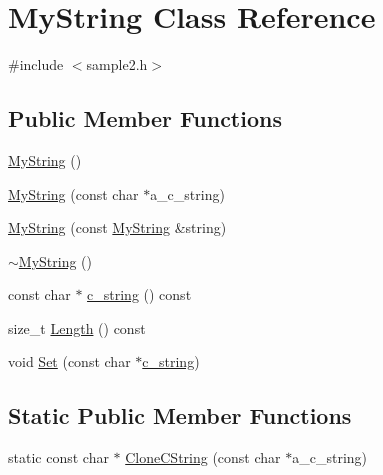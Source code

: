 \hypertarget{class_my_string}{\section{My\-String Class Reference}
\label{class_my_string}
}


{\ttfamily \#include $<$sample2.\-h$>$}

\subsection*{Public Member Functions}
\begin{DoxyCompactItemize}
\item 
\hyperlink{class_my_string_a1cb17852b83614394b59720779c5f918}{My\-String} ()
\item 
\hyperlink{class_my_string_a28134eb91b6698f46b12accefa157d0f}{My\-String} (const char $\ast$a\-\_\-c\-\_\-string)
\item 
\hyperlink{class_my_string_ae24c7cf89a58dd2287303df2ac054c66}{My\-String} (const \hyperlink{class_my_string}{My\-String} \&string)
\item 
\hyperlink{class_my_string_a7bee4fe8ad82a0b7b8f65b02054b156b}{$\sim$\-My\-String} ()
\item 
const char $\ast$ \hyperlink{class_my_string_a0089588935fc8235124f58f514cb07a1}{c\-\_\-string} () const 
\item 
size\-\_\-t \hyperlink{class_my_string_a878f7e0a327814729a04a412d7b95801}{Length} () const 
\item 
void \hyperlink{class_my_string_a521c4cd7eccac6ce554d8a51505e4970}{Set} (const char $\ast$\hyperlink{class_my_string_a0089588935fc8235124f58f514cb07a1}{c\-\_\-string})
\end{DoxyCompactItemize}
\subsection*{Static Public Member Functions}
\begin{DoxyCompactItemize}
\item 
static const char $\ast$ \hyperlink{class_my_string_a40753dcfa3314a8993f32bdd75d67ce2}{Clone\-C\-String} (const char $\ast$a\-\_\-c\-\_\-string)
\end{DoxyCompactItemize}


